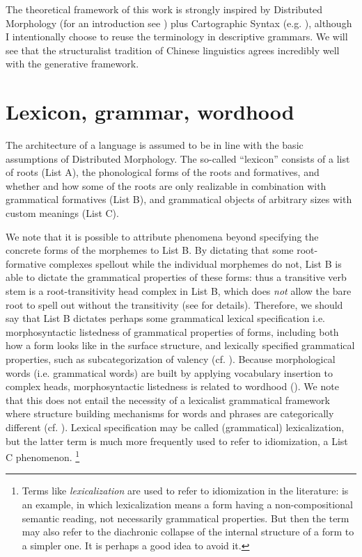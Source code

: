\documentclass[UTF8, a4paper, oneside, scheme=plain, 12pt]{ctexrep}
\newcommand*{\term}[1]{\emph{#1}}
\begin{document}
{\small
The theoretical framework of this work is strongly inspired by Distributed Morphology (for an introduction see \citet{siddiqi2009syntax}) plus Cartographic Syntax (e.g. \citet{cinque1999adverbs}),
although I intentionally choose to reuse the terminology in descriptive grammars.
We will see that the structuralist tradition of Chinese linguistics agrees incredibly well with the generative framework.

\section{Lexicon, grammar, wordhood}\label{sec:intro.theory.architecture}

The architecture of a language is assumed to be in line with the basic assumptions of Distributed Morphology. 
The so-called ``lexicon'' consists of a list of roots (List A),
the phonological forms of the roots and formatives, 
and whether and how some of the roots are only realizable in combination with grammatical formatives (List B),
and grammatical objects of arbitrary sizes with custom meanings (List C).

We note that it is possible to attribute phenomena beyond specifying the concrete forms of the morphemes to List B.
By dictating that some root-formative complexes spellout while the individual morphemes do not,
List B is able to dictate the grammatical properties of these forms:
thus a transitive verb stem is a root-transitivity head complex in List B, 
which does \emph{not} allow the bare root to spell out without the transitivity
(see \citealt{siddiqi2009syntax} for details).
Therefore, we should say that List B dictates perhaps some grammatical lexical specification i.e. morphosyntactic listedness of grammatical properties of forms,
including both how a form looks like in the surface structure,
and lexically specified grammatical properties, such as subcategorization of valency
(cf. ).
Because morphological words (i.e. grammatical words) are built by applying vocabulary insertion to complex heads,
morphosyntactic listedness is related to wordhood ().
We note that this does not entail the necessity of a lexicalist grammatical framework where structure building mechanisms for words and phrases are categorically different (cf. \citealt{bruening2018lexicalist}).
Lexical specification may be called (grammatical) lexicalization,
but the latter term is much more frequently used to refer to idiomization, a List C phenomenon.%
\footnote{
    Terms like \term{lexicalization} are used to refer to idiomization in the literature: \citet{harley1999distributed} is an example, in which lexicalization means a form having a non-compositional semantic reading, not necessarily grammatical properties.
    But then the term may also refer to the diachronic collapse of the internal structure of a form to a simpler one.
    It is perhaps a good idea to avoid it.
}

}
\end{document}
